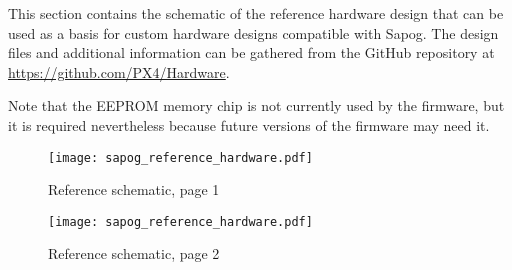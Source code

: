 \documentclass{zubaxdoc}
\begin{document}
	This section contains the schematic of the reference hardware design that can be used as a basis for custom hardware
	designs compatible with Sapog.
	The design files and additional information can be gathered from the GitHub repository at
	\url{https://github.com/PX4/Hardware}.
	
	Note that the EEPROM memory chip is not currently used by the firmware,
	but it is required nevertheless because future versions of the firmware may need it.
	
	\begin{figure}[hbt]
		\centering
		\texttt{[image: sapog\_reference\_hardware.pdf]}
		\caption{Reference schematic, page 1}
	\end{figure}
	
	\begin{figure}[hbt]
		\centering
		\texttt{[image: sapog\_reference\_hardware.pdf]}
		\caption{Reference schematic, page 2}
	\end{figure}
	
\end{document}
